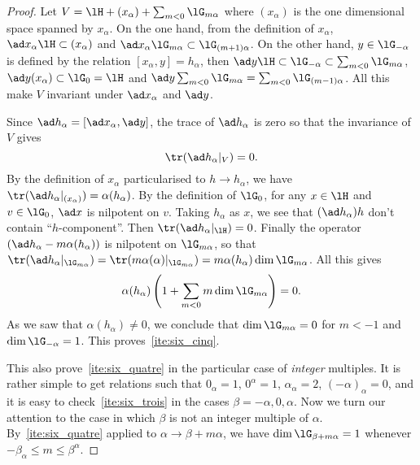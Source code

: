 \begin{proof}
	Let $V=\lH+(x_{\alpha})+\sum_{m<0}\lG_{m\alpha}$ where $(x_{\alpha})$ is the one dimensional space spanned by $x_{\alpha}$. On the one hand,  from the definition of $x_{\alpha}$, $\ad x_{\alpha}\lH\subset(x_{\alpha})$ and $\ad x_{\alpha}\lG_{m\alpha}\subset\lG_{(m+1)\alpha}$. On the other hand, $y\in\lG_{-\alpha}$ is defined by the relation $[x_{\alpha},y]=h_{\alpha}$, then  $\ad y\lH\subset\lG_{-\alpha}\subset\sum_{m<0}\lG_{m\alpha}$, $\ad y(x_{\alpha})\subset\lG_0=\lH$ and $\ad y\sum_{m<0}\lG_{m\alpha}=\sum_{m<0}\lG_{(m-1)\alpha}$. All this make $V$ invariant under $\ad x_{\alpha}$ and $\ad y$.

	Since $\ad h_{\alpha}=[\ad x_{\alpha},\ad y]$, the trace of $\ad h_{\alpha}$ is zero so that the invariance of $V$ gives
	\[
		\tr(\ad h_{\alpha}|_V)=0.
	\]
	By the definition of $x_{\alpha}$ particularised to $h\to h_{\alpha}$, we have $\tr(\ad h_{\alpha}|_{(x_{\alpha})})=\alpha(h_{\alpha})$. By the definition of $\lG_0$, for any $x\in\lH$ and $v\in\lG_0$, $\ad x$ is nilpotent on $v$. Taking $h_{\alpha}$ as $x$, we see that
	$(\ad h_{\alpha})h$ don't contain ``$h$-component''. Then $\tr(\ad h_{\alpha}|_{\lH})=0$. Finally the operator $(\ad h_{\alpha}-m\alpha(h_{\alpha}))$ is nilpotent on $\lG_{m\alpha}$, so that $\tr(\ad h_{\alpha}|_{\lG_{m\alpha}})=\tr( m\alpha(\alpha)|_{\lG_{m\alpha}} )=m\alpha(h_{\alpha})\dim\lG_{m\alpha}$. All this gives
	\begin{equation}
		\alpha(h_{\alpha})\left( 1+\sum_{m<0}m\dim\lG_{m\alpha}  \right)=0.
	\end{equation}
	As we saw that $\alpha(h_{\alpha})\neq 0$, we conclude that $\dim\lG_{m\alpha}=0$ for $m<-1$ and $\dim\lG_{-\alpha}=1$. This proves~\ref{ite:six_cinq}.

	This also prove~\ref{ite:six_quatre} in the particular case of \emph{integer} multiples. It is rather simple to get relations such that $0_{\alpha}=1$, $0^{\alpha}=1$, $\alpha_{\alpha}=2$, $(-\alpha)_{\alpha}=0$, and it is easy to check~\ref{ite:six_trois} in the cases $\beta=-\alpha,0,\alpha$. Now we turn our attention to the case in which $\beta$ is not an integer multiple of $\alpha$. By~\ref{ite:six_quatre} applied to $\alpha\to\beta+m\alpha$, we have $\dim\lG_{\beta+m\alpha}=1$ whenever $-\beta_{\alpha}\leq m\leq\beta^{\alpha}$.


\end{proof}
